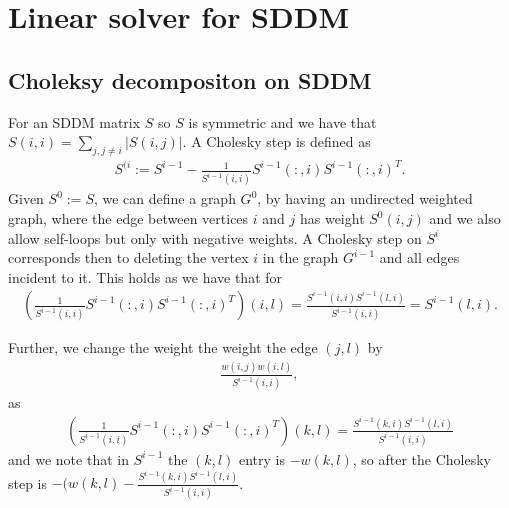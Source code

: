 \section{Linear solver for SDDM}
\subsection{Choleksy decompositon on SDDM}
For an SDDM matrix $S$ so $S$ is symmetric and we have that 
$S(i,i)= \sum_{j,j\neq i} |S(i,j)|$. A Cholesky step is defined as 
\begin{align*}
    S^{(i}:= S^{i-1}- \frac{1}{S^{i-1}(i,i)} S^{i-1}(:,i) S^{i-1}(:,i)^T.
\end{align*}
Given $S^0:=S$, we can define a graph $G^{0}$, by having an undirected weighted graph, where the edge between vertices $i$ and $j$ has weight  $S^{0}(i,j)$ and we also allow self-loops but only with negative weights.   A Cholesky step on $S^{i}$ corresponds then to deleting the vertex $i$ in the graph $G^{i-1}$ and all edges incident to it.
This holds as we have that for  
\begin{align*}
    \left(\frac{1}{S^{i-1}(i,i)} S^{i-1}(:,i) S^{i-1}(:,i)^T\right)(i,l)= \frac{S^{i-1}(i,i) S^{i-1}(l,i)}{S^{i-1}(i,i)} = S^{i-1}(l,i).
\end{align*}


Further, we change the weight the weight the edge $(j,l)$ by
\begin{align*}
    \frac{w(i,j) w(i,l)}{ S^{i-1}(i,i)}, 
\end{align*} 
as 
\begin{align*}
    \left(\frac{1}{S^{i-1}(i,i)} S^{i-1}(:,i) S^{i-1}(:,i)^T\right)(k,l)= \frac{S^{i-1}(k,i) S^{i-1}(l,i)}{S^{i-1}(i,i)}
\end{align*}
and we note that in $S^{i-1}$ the $(k,l)$ entry is $-w(k,l)$, so after the Cholesky step is $-(w(k,l)-\frac{S^{i-1}(k,i) S^{i-1}(l,i)}{S^{i-1}(i,i)}$.

